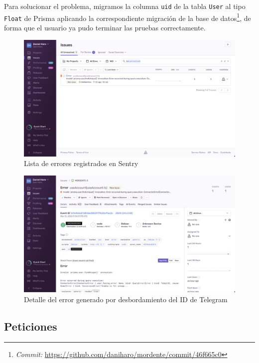 Para solucionar el problema, migramos la columna \texttt{uid} de la tabla \texttt{User} al tipo \texttt{Float} de Prisma aplicando la correspondiente migración de la base de datos\footnote{\textit{Commit:} \url{https://github.com/daniharo/mordente/commit/46f665c0}}, de forma que el usuario ya pudo terminar las pruebas correctamente.

\begin{figure}[h]
\centering
\includegraphics[width=\textwidth]{imagenes/pruebas/sentry_error_uid.png}
\caption{Lista de errores registrados en Sentry}
\label{fig:sentryListaErrores}
\end{figure}

\begin{figure}[h]
\centering
\includegraphics[width=\textwidth]{imagenes/pruebas/sentry_detalle_error_uid.png}
\caption{Detalle del error generado por desbordamiento del ID de Telegram}
\label{fig:sentryDetalleError}
\end{figure}

\subsection{Peticiones}

